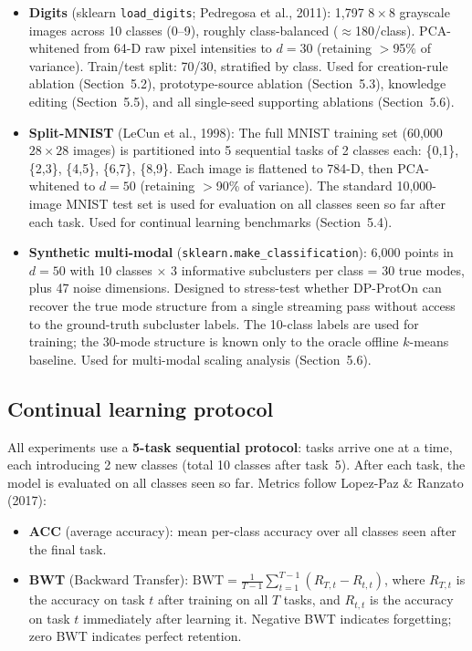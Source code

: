 \documentclass[11pt,a4paper]{article}
\begin{document}
\begin{itemize}[leftmargin=*]
\item \textbf{Digits} (sklearn \texttt{load\_digits}; Pedregosa et al., 2011): 1,797 $8\times8$ grayscale images across 10 classes (0--9), roughly class-balanced ($\approx$180/class). PCA-whitened from 64-D raw pixel intensities to $d{=}30$ (retaining $>$95\% of variance). Train/test split: 70/30, stratified by class. Used for creation-rule ablation (Section~5.2), prototype-source ablation (Section~5.3), knowledge editing (Section~5.5), and all single-seed supporting ablations (Section~5.6).

\item \textbf{Split-MNIST} (LeCun et al., 1998): The full MNIST training set (60,000 $28\times28$ images) is partitioned into 5 sequential tasks of 2 classes each: \{0,1\}, \{2,3\}, \{4,5\}, \{6,7\}, \{8,9\}. Each image is flattened to 784-D, then PCA-whitened to $d{=}50$ (retaining $>$90\% of variance). The standard 10,000-image MNIST test set is used for evaluation on all classes seen so far after each task. Used for continual learning benchmarks (Section~5.4).

\item \textbf{Synthetic multi-modal} (\texttt{sklearn.make\_classification}): 6,000 points in $d{=}50$ with 10 classes $\times$ 3 informative subclusters per class = 30 true modes, plus 47 noise dimensions. Designed to stress-test whether DP-ProtOn can recover the true mode structure from a single streaming pass without access to the ground-truth subcluster labels. The 10-class labels are used for training; the 30-mode structure is known only to the oracle offline $k$-means baseline. Used for multi-modal scaling analysis (Section~5.6).
\end{itemize}

\subsection{Continual learning protocol}

All experiments use a \textbf{5-task sequential protocol}: tasks arrive one at a time, each introducing 2 new classes (total 10 classes after task~5). After each task, the model is evaluated on all classes seen so far. Metrics follow Lopez-Paz \& Ranzato (2017):
\begin{itemize}[leftmargin=*]
\item \textbf{ACC} (average accuracy): mean per-class accuracy over all classes seen after the final task.
\item \textbf{BWT} (Backward Transfer): $\text{BWT} = \frac{1}{T-1}\sum_{t=1}^{T-1} (R_{T,t} - R_{t,t})$, where $R_{T,t}$ is the accuracy on task $t$ after training on all $T$ tasks, and $R_{t,t}$ is the accuracy on task $t$ immediately after learning it. Negative BWT indicates forgetting; zero BWT indicates perfect retention.
\end{itemize}
\end{document}
